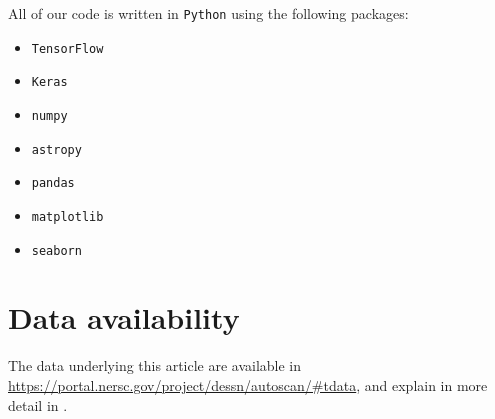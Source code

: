 All of our code is written in \texttt{Python} using the following packages:
\begin{itemize}
\item \texttt{TensorFlow \citep{tensorflow2015-whitepaper}}
\item \texttt{Keras \citep{chollet2015keras}}
\item \texttt{numpy \citep{harris2020array}}
\item \texttt{astropy \citep{astropy:2013, astropy:2018} }
\item \texttt{pandas \citep{mckinney-proc-scipy-2010, reback2020pandas}}
\item \texttt{matplotlib \citep{Hunter:2007}}
\item \texttt{seaborn \citep{Waskom2021}}
\end{itemize}


\section{Data availability}
The data underlying this article are available in 
\url{https://portal.nersc.gov/project/dessn/autoscan/#tdata},
and explain in more detail in \cite{Goldstein_2015}.

